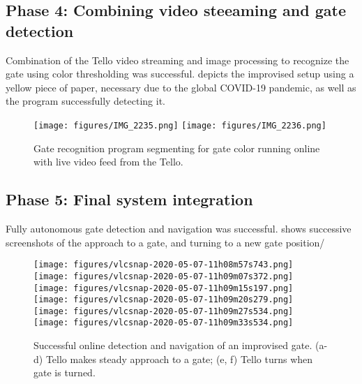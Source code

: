 \subsection{Phase 4: Combining video steeaming and gate detection}
Combination of the Tello video streaming and image processing to recognize the gate using color thresholding was successful.  depicts the improvised setup using a yellow piece of paper, necessary due to the global COVID-19 pandemic, as well as the program successfully detecting it. 
\begin{figure}
\begin{center}
\texttt{[image: figures/IMG\_2235.png]}
\texttt{[image: figures/IMG\_2236.png]}
\end{center}
\caption{Gate recognition program segmenting for gate color running online with live video feed from the Tello.}
\label{fig:7}
\end{figure}

\subsection{Phase 5: Final system integration}
Fully autonomous gate detection and navigation was successful.  shows successive screenshots of the approach to a gate, and turning to a new gate position/
\begin{figure}
\begin{center}
\texttt{[image: figures/vlcsnap-2020-05-07-11h08m57s743.png]}
\texttt{[image: figures/vlcsnap-2020-05-07-11h09m07s372.png]}
\texttt{[image: figures/vlcsnap-2020-05-07-11h09m15s197.png]}
\texttt{[image: figures/vlcsnap-2020-05-07-11h09m20s279.png]}
\texttt{[image: figures/vlcsnap-2020-05-07-11h09m27s534.png]}
\texttt{[image: figures/vlcsnap-2020-05-07-11h09m33s534.png]}
\end{center}
\caption{Successful online detection and navigation of an improvised gate. (a-d) Tello makes steady approach to a gate; (e, f) Tello turns when gate is turned.}
\label{fig:8}
\end{figure}

